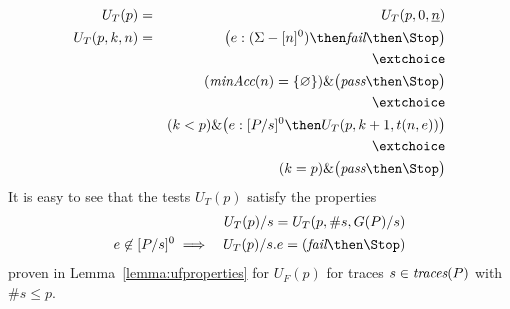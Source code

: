 \begin{eqnarray}
U_T(p) & = & U_T(p,0,\ii n)
\\
U_T(p,k,n) & = & \big(  e:(\Sigma - [n]^0)   \then \efail\then \Stop \big)
\label{eq:uta}
\\ & & \extchoice \nonumber
\\ & & (\minaccs(n) = \{ \varnothing \})   \&   \big( \epass \then \Stop \big)
\label{eq:utb}
\\ & & \extchoice \nonumber
\\ & & (k < p) \& \big( e:[P/s]^0   \then U_T(p,k+1,t(n,e)) \big)
\label{eq:utc}
\\ & & \extchoice \nonumber
\\ & & (k = p) \& \big( \epass\then \Stop  \big)
\label{eq:utd}
\end{eqnarray}
%
It is easy to see that the tests $U_T(p)$ satisfy the properties
\begin{eqnarray}
\label{eq:ifpaT}
  &  & U_T(p)/s = U_T(p,\#s,G(P)/s)
\\
\label{eq:ifpbT}
e\not\in [P/s]^0 & \implies & U_T(p)/s.e = (\efail\then\Stop)
\end{eqnarray}
proven in Lemma~\ref{lemma:ufproperties} for $U_F(p)$ for traces
$s\in\text{\it traces}(P)$ with $\#s \le p$. 


